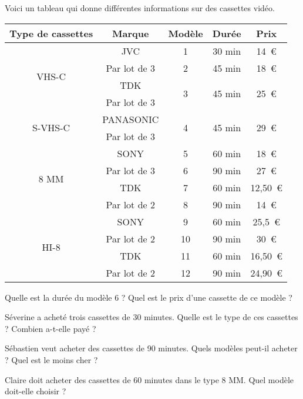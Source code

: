 Voici un tableau qui donne différentes informations sur des cassettes vidéo.
\begin{center}
  \begin{tabular}{|c|c|c|c|c|}
\hline
Type de cassettes&Marque&Modèle&Durée&Prix\\
\hline
\multirow{4}{2cm}{\centerline{VHS-C}}&JVC&1&30 min&14~\textgreek{\euro}\\
\cline{3-5}
&Par lot de 3&2&45 min&18~\textgreek{\euro}\\
\cline{2-5}
&TDK&\multirow{2}{2cm}{\centerline{3}}&\multirow{2}{2cm}{\centerline{45 min}}&\multirow{2}{2cm}{\centerline{25~\textgreek{\euro}}}\\
&Par lot de 3&&&\\
\hline
\multirow{2}{3cm}{\centerline{S-VHS-C}}&PANASONIC&\multirow{2}{2cm}{\centerline{4}}&\multirow{2}{2cm}{\centerline{45 min}}&\multirow{2}{2cm}{\centerline{29~\textgreek{\euro}}}\\
&Par lot de 3&&&\\
\hline
\multirow{4}{3cm}{\centerline{8 MM}}&SONY&5&60 min&18~\textgreek{\euro}\\
\cline{3-5}
&Par lot de 3&6&90 min&27~\textgreek{\euro}\\
\cline{2-5}
&TDK&7&60 min&12,50~\textgreek{\euro}\\
\cline{3-5}
&Par lot de 2&8&90 min&14~\textgreek{\euro}\\
\hline
\multirow{4}{3cm}{\centerline{HI-8}}&SONY&9&60 min&25,5~\textgreek{\euro}\\
\cline{3-5}
&Par lot de 2&10&90 min&30~\textgreek{\euro}\\
\cline{2-5}
&TDK&11&60 min&16,50~\textgreek{\euro}\\
\cline{3-5}
&Par lot de 2&12&90 min&24,90~\textgreek{\euro}\\
\hline
  \end{tabular}
\end{center}
\begin{myenumerate}
\item Quelle est la durée du modèle 6 ? Quel est le prix d'une
cassette de ce modèle ?
\item Séverine a acheté trois cassettes de 30 minutes. Quelle est le
type de ces cassettes ? Combien a-t-elle payé ?
\item Sébastien veut acheter des cassettes de 90 minutes. Quels
modèles peut-il acheter ? Quel est le moins cher ?
\item Claire doit acheter des cassettes de 60 minutes dans le type 8
MM. Quel modèle doit-elle choisir ?
\end{myenumerate}